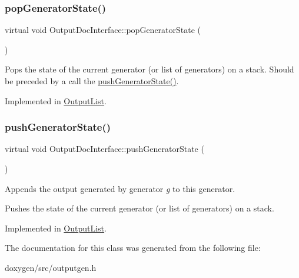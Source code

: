\subsubsection{\texorpdfstring{popGeneratorState()}{popGeneratorState()}}
{\footnotesize\ttfamily virtual void Output\+Doc\+Interface\+::pop\+Generator\+State (\begin{DoxyParamCaption}{ }\end{DoxyParamCaption})\hspace{0.3cm}{\ttfamily [pure virtual]}}

Pops the state of the current generator (or list of generators) on a stack. Should be preceded by a call the \mbox{\hyperlink{class_output_doc_interface_aba5fd4dd5b0360723e62fedc7d353f29}{push\+Generator\+State()}}. 

Implemented in \mbox{\hyperlink{class_output_list_a94eb1af2ea07425ef1faa539d24adcf8}{Output\+List}}.

\mbox{\label{class_output_doc_interface_aba5fd4dd5b0360723e62fedc7d353f29}} 
\subsubsection{\texorpdfstring{pushGeneratorState()}{pushGeneratorState()}}
{\footnotesize\ttfamily virtual void Output\+Doc\+Interface\+::push\+Generator\+State (\begin{DoxyParamCaption}{ }\end{DoxyParamCaption})\hspace{0.3cm}{\ttfamily [pure virtual]}}

Appends the output generated by generator {\itshape g} to this generator.

Pushes the state of the current generator (or list of generators) on a stack. 

Implemented in \mbox{\hyperlink{class_output_list_a885957a64f7d87aefb663c4ec903188f}{Output\+List}}.



The documentation for this class was generated from the following file\+:\begin{DoxyCompactItemize}
\item 
doxygen/src/outputgen.\+h\end{DoxyCompactItemize}
